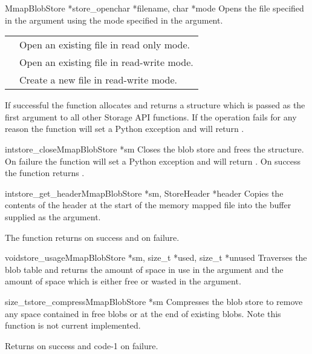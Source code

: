 \begin{cfuncdesc}{MmapBlobStore *}{store_open}{char *filename, char *mode}
Opens the file specified in the  argument using the mode
specified in the  argument.

\begin{longtable}{l|l}
\code{'r'} & Open an existing file in read only mode. \\
\code{'r+'} & Open an existing file in read-write mode. \\
\code{'w+'} & Create a new file in read-write mode. \\
\end{longtable}

If successful the function allocates and returns a
 structure which is passed as the first argument
to all other Storage API functions.  If the operation fails for any
reason the function will set a Python exception and will return
\NULL{}.
\end{cfuncdesc}

\begin{cfuncdesc}{int}{store_close}{MmapBlobStore *sm}
Closes the blob store and frees the  structure.
On failure the function will set a Python exception and will return
.  On success the function returns .
\end{cfuncdesc}

\begin{cfuncdesc}{int}{store_get_header}{MmapBlobStore *sm, StoreHeader *header}
Copies the contents of the header at the start of the memory mapped
file into the buffer supplied as the  argument.

The function returns  on success and  on failure.
\end{cfuncdesc}

\begin{cfuncdesc}{void}{store_usage}{MmapBlobStore *sm, size_t *used, size_t *unused}
Traverses the blob table and returns the amount of space in use in the
 argument and the amount of space which is either free or
wasted in the  argument.
\end{cfuncdesc}

\begin{cfuncdesc}{size_t}{store_compress}{MmapBlobStore *sm}
Compresses the blob store to remove any space contained in free blobs
or at the end of existing blobs.  Note this function is not current
implemented.

Returns  on success and code{-1} on failure.
\end{cfuncdesc}

